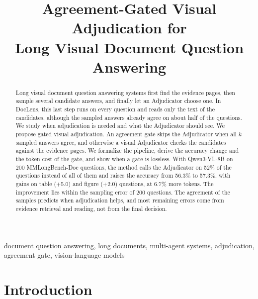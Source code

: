 \documentclass[conference]{IEEEtran}
\newif\ifextended
\begin{document}
\title{Agreement-Gated Visual Adjudication for\\Long Visual Document Question Answering}

\author{
}

\maketitle

\begin{abstract}
Long visual document question answering systems first find the evidence pages, then sample several candidate answers, and finally let an Adjudicator choose one. In DocLens, this last step runs on every question and reads only the text of the candidates, although the sampled answers already agree on about half of the questions. We study when adjudication is needed and what the Adjudicator should see. We propose gated visual adjudication. An agreement gate skips the Adjudicator when all $k$ sampled answers agree, and otherwise a visual Adjudicator checks the candidates against the evidence pages. We formalize the pipeline, derive the accuracy change and the token cost of the gate, and show when a gate is lossless. With Qwen3-VL-8B on 200 MMLongBench-Doc questions, the method calls the Adjudicator on 52\% of the questions instead of all of them and raises the accuracy from 56.3\% to 57.3\%, with gains on table (+5.0) and figure (+2.0) questions, at 6.7\% more tokens. The improvement lies within the sampling error of 200 questions. The agreement of the samples predicts when adjudication helps, and most remaining errors come from evidence retrieval and reading, not from the final decision.
\end{abstract}

\begin{IEEEkeywords}
document question answering, long documents, multi-agent systems, adjudication, agreement gate, vision-language models
\end{IEEEkeywords}


\section{Introduction}
\label{sec:intro}
\end{document}
